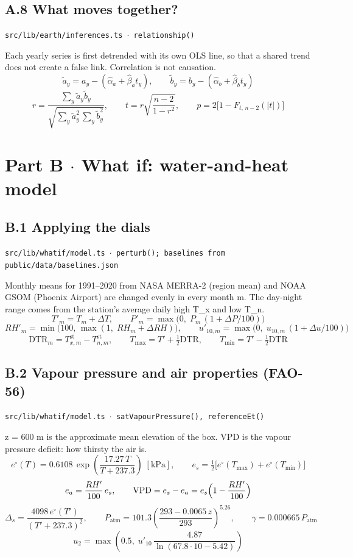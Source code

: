 \documentclass[10pt,a4paper]{article}
\begin{document}
\subsection*{A.8 What moves together?}
{\footnotesize\texttt{src/lib/earth/inferences.ts $\cdot$ relationship()}}

Each yearly series is first detrended with its own OLS line, so that a shared trend does not create a false link. Correlation is not causation.
\[
\tilde a_y = a_y - (\hat\alpha_a + \hat\beta_a t_y), \qquad \tilde b_y = b_y - (\hat\alpha_b + \hat\beta_b t_y)
\]
\[
r = \frac{\sum_y \tilde a_y \tilde b_y}{\sqrt{\sum_y \tilde a_y^2 \,\sum_y \tilde b_y^2}}, \qquad t = r\sqrt{\frac{n-2}{1-r^2}}, \qquad p = 2\bigl[1 - F_{t,\,n-2}(|t|)\bigr]
\]

\section*{Part B $\cdot$ What if: water-and-heat model}

\subsection*{B.1 Applying the dials}
{\footnotesize\texttt{src/lib/whatif/model.ts $\cdot$ perturb(); baselines from public/data/baselines.json}}

Monthly means for 1991--2020 from NASA MERRA-2 (region mean) and NOAA GSOM (Phoenix Airport) are changed evenly in every month m. The day-night range comes from the station's average daily high T\_x and low T\_n.
\[
T'_m = T_m + \Delta T, \qquad P'_m = \max\!\bigl(0,\; P_m\,(1 + \Delta P/100)\bigr)
\]
\[
RH'_m = \min\!\bigl(100,\, \max(1,\; RH_m + \Delta RH)\bigr), \qquad u'_{10,m} = \max\!\bigl(0,\; u_{10,m}\,(1 + \Delta u/100)\bigr)
\]
\[
\mathrm{DTR}_m = T^{\text{st}}_{x,m} - T^{\text{st}}_{n,m}, \qquad T_{\max} = T' + \tfrac12\mathrm{DTR}, \qquad T_{\min} = T' - \tfrac12\mathrm{DTR}
\]

\subsection*{B.2 Vapour pressure and air properties (FAO-56)}
{\footnotesize\texttt{src/lib/whatif/model.ts $\cdot$ satVapourPressure(), referenceEt()}}

z = 600 m is the approximate mean elevation of the box. VPD is the vapour pressure deficit: how thirsty the air is.
\[
e^\circ(T) = 0.6108\,\exp\!\left(\frac{17.27\,T}{T + 237.3}\right) \;[\mathrm{kPa}], \qquad e_s = \tfrac12\bigl[e^\circ(T_{\max}) + e^\circ(T_{\min})\bigr]
\]
\[
e_a = \frac{RH'}{100}\, e_s, \qquad \mathrm{VPD} = e_s - e_a = e_s\Bigl(1 - \frac{RH'}{100}\Bigr)
\]
\[
\Delta_s = \frac{4098\, e^\circ(T')}{(T' + 237.3)^2}, \qquad P_{\text{atm}} = 101.3\left(\frac{293 - 0.0065\,z}{293}\right)^{5.26}, \qquad \gamma = 0.000665\, P_{\text{atm}}
\]
\[
u_2 = \max\!\left(0.5,\; u'_{10}\,\frac{4.87}{\ln(67.8\cdot 10 - 5.42)}\right)
\]
\end{document}
